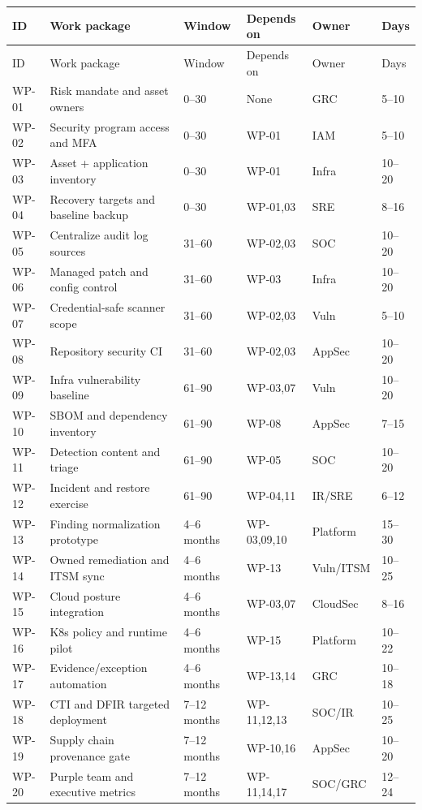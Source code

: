 \documentclass[11pt,oneside]{report}
\begin{document}
\begin{longtable}{P{0.09\textwidth}P{0.275\textwidth}P{0.12\textwidth}P{0.135\textwidth}P{0.105\textwidth}P{0.07\textwidth}}
\toprule ID & Work package & Window & Depends on & Owner & Days\\\midrule\endfirsthead
\toprule ID & Work package & Window & Depends on & Owner & Days\\\midrule\endhead

WP-01 & Risk mandate and asset owners & 0–30 & None & GRC & 5–10 \\
WP-02 & Security program access and MFA & 0–30 & WP-01 & IAM & 5–10 \\
WP-03 & Asset + application inventory & 0–30 & WP-01 & Infra & 10–20 \\
WP-04 & Recovery targets and baseline backup & 0–30 & WP-01,03 & SRE & 8–16 \\
WP-05 & Centralize audit log sources & 31–60 & WP-02,03 & SOC & 10–20 \\
WP-06 & Managed patch and config control & 31–60 & WP-03 & Infra & 10–20 \\
WP-07 & Credential-safe scanner scope & 31–60 & WP-02,03 & Vuln & 5–10 \\
WP-08 & Repository security CI & 31–60 & WP-02,03 & AppSec & 10–20 \\
WP-09 & Infra vulnerability baseline & 61–90 & WP-03,07 & Vuln & 10–20 \\
WP-10 & SBOM and dependency inventory & 61–90 & WP-08 & AppSec & 7–15 \\
WP-11 & Detection content and triage & 61–90 & WP-05 & SOC & 10–20 \\
WP-12 & Incident and restore exercise & 61–90 & WP-04,11 & IR/SRE & 6–12 \\
WP-13 & Finding normalization prototype & 4–6 months & WP-03,09,10 & Platform & 15–30 \\
WP-14 & Owned remediation and ITSM sync & 4–6 months & WP-13 & Vuln/ITSM & 10–25 \\
WP-15 & Cloud posture integration & 4–6 months & WP-03,07 & CloudSec & 8–16 \\
WP-16 & K8s policy and runtime pilot & 4–6 months & WP-15 & Platform & 10–22 \\
WP-17 & Evidence/exception automation & 4–6 months & WP-13,14 & GRC & 10–18 \\
WP-18 & CTI and DFIR targeted deployment & 7–12 months & WP-11,12,13 & SOC/IR & 10–25 \\
WP-19 & Supply chain provenance gate & 7–12 months & WP-10,16 & AppSec & 10–20 \\
WP-20 & Purple team and executive metrics & 7–12 months & WP-11,14,17 & SOC/GRC & 12–24 \\
\bottomrule\end{longtable}\normalsize
\end{document}

